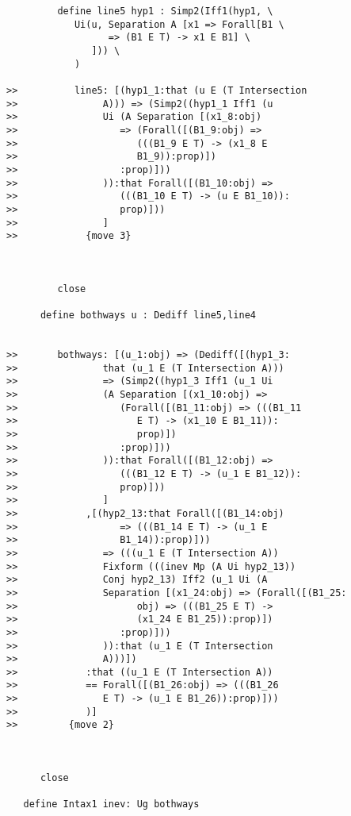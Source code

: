 \documentclass[12pt]{article}
\begin{document}
\begin{verbatim}
         define line5 hyp1 : Simp2(Iff1(hyp1, \
            Ui(u, Separation A [x1 => Forall[B1 \
                  => (B1 E T) -> x1 E B1] \
               ])) \
            )

>>          line5: [(hyp1_1:that (u E (T Intersection
>>               A))) => (Simp2((hyp1_1 Iff1 (u
>>               Ui (A Separation [(x1_8:obj)
>>                  => (Forall([(B1_9:obj) =>
>>                     (((B1_9 E T) -> (x1_8 E
>>                     B1_9)):prop)])
>>                  :prop)]))
>>               )):that Forall([(B1_10:obj) =>
>>                  (((B1_10 E T) -> (u E B1_10)):
>>                  prop)]))
>>               ]
>>            {move 3}



         close

      define bothways u : Dediff line5,line4


>>       bothways: [(u_1:obj) => (Dediff([(hyp1_3:
>>               that (u_1 E (T Intersection A)))
>>               => (Simp2((hyp1_3 Iff1 (u_1 Ui
>>               (A Separation [(x1_10:obj) =>
>>                  (Forall([(B1_11:obj) => (((B1_11
>>                     E T) -> (x1_10 E B1_11)):
>>                     prop)])
>>                  :prop)]))
>>               )):that Forall([(B1_12:obj) =>
>>                  (((B1_12 E T) -> (u_1 E B1_12)):
>>                  prop)]))
>>               ]
>>            ,[(hyp2_13:that Forall([(B1_14:obj)
>>                  => (((B1_14 E T) -> (u_1 E
>>                  B1_14)):prop)]))
>>               => (((u_1 E (T Intersection A))
>>               Fixform (((inev Mp (A Ui hyp2_13))
>>               Conj hyp2_13) Iff2 (u_1 Ui (A
>>               Separation [(x1_24:obj) => (Forall([(B1_25:
>>                     obj) => (((B1_25 E T) ->
>>                     (x1_24 E B1_25)):prop)])
>>                  :prop)]))
>>               )):that (u_1 E (T Intersection
>>               A)))])
>>            :that ((u_1 E (T Intersection A))
>>            == Forall([(B1_26:obj) => (((B1_26
>>               E T) -> (u_1 E B1_26)):prop)]))
>>            )]
>>         {move 2}



      close

   define Intax1 inev: Ug bothways


\end{verbatim}
\end{document}
